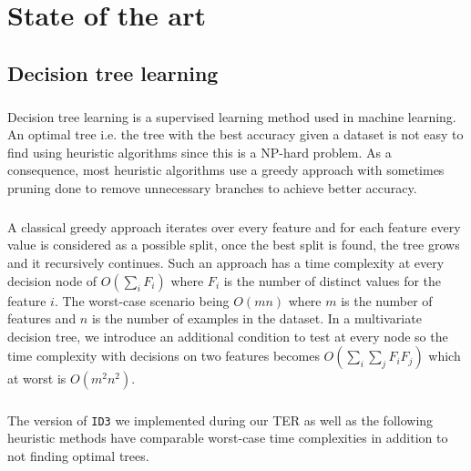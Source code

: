\documentclass[12pt]{report}
\theoremstyle{definition}
\theoremstyle{definition}
\theoremstyle{definition}
\begin{document}
\chapter{State of the art}
\section{Decision tree learning} 
\paragraph{} Decision tree learning is a supervised learning method used in machine learning. An optimal tree i.e.
the tree with the best accuracy given a dataset is not easy to find using heuristic algorithms since this is
a NP-hard problem. As a consequence, most heuristic algorithms use a greedy approach with sometimes pruning
done to remove unnecessary branches to achieve better accuracy.

\paragraph{} A classical greedy approach iterates over every feature and for each feature every value is
considered as a possible split, once the best split is found, the tree grows and it recursively continues.
Such an approach has a time complexity at every decision node of $O(\sum_{i}^{}F_i)$ where $F_i$ is the number
of distinct values for the feature $i$. The worst-case scenario being $O(mn)$ where $m$ is the number of
features and $n$ is the number of examples in the dataset. In a multivariate decision tree, we introduce an
additional condition to test at every node so the time complexity with decisions on two features becomes
$O(\sum_{i}\sum_{j}F_iF_j)$ which at worst is $O(m^2n^2)$.

\paragraph{} The version of \texttt{ID3} we implemented during our TER as well as the following heuristic methods have
comparable worst-case time complexities in addition to not finding optimal trees.

\newpage
\end{document}
